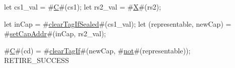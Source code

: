 let cs1_val = #\hyperref[sailRISCVzC]{C}#(cs1);
let rs2_val = #\hyperref[sailRISCVzX]{X}#(rs2);

let inCap = #\hyperref[sailRISCVzclearTagIfSealed]{clearTagIfSealed}#(cs1_val);
let (representable, newCap) = #\hyperref[sailRISCVzsetCapAddr]{setCapAddr}#(inCap, rs2_val);

#\hyperref[sailRISCVzC]{C}#(cd) = #\hyperref[sailRISCVzclearTagIf]{clearTagIf}#(newCap, #\hyperref[sailRISCVznot]{not}#(representable));
RETIRE_SUCCESS
